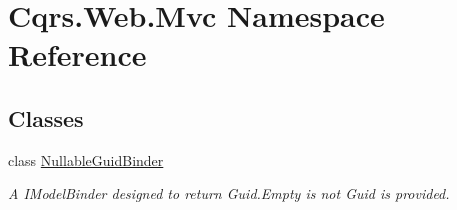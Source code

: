 \hypertarget{namespaceCqrs_1_1Web_1_1Mvc}{}\section{Cqrs.\+Web.\+Mvc Namespace Reference}
\label{namespaceCqrs_1_1Web_1_1Mvc}
\subsection*{Classes}
\begin{DoxyCompactItemize}
\item 
class \hyperlink{classCqrs_1_1Web_1_1Mvc_1_1NullableGuidBinder}{Nullable\+Guid\+Binder}
\begin{DoxyCompactList}\small\item\em A I\+Model\+Binder designed to return Guid.\+Empty is not Guid is provided. \end{DoxyCompactList}\end{DoxyCompactItemize}
